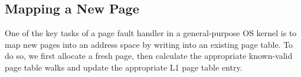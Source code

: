 \subsection{Mapping a New Page}
One of the key tasks of a page fault handler in a general-purpose OS kernel is to map new pages into an address space by writing into an existing page table. To do so, we first allocate a fresh page, then calculate the appropriate known-valid page table walks and update the appropriate L1 page table entry.
\newcommand{\fpaddr}{\texttt{fpaddr}}
\newcommand{\specline}[1]{{\color{blue}\left\{#1\right\}}}
